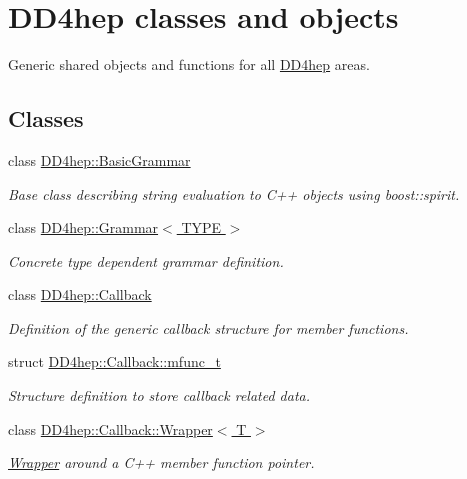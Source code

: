 \hypertarget{group___d_d4_h_e_p}{
\section{DD4hep classes and objects}
\label{group___d_d4_h_e_p}
}


Generic shared objects and functions for all \hyperlink{namespace_d_d4hep}{DD4hep} areas.  
\subsection*{Classes}
\begin{DoxyCompactItemize}
\item 
class \hyperlink{class_d_d4hep_1_1_basic_grammar}{DD4hep::BasicGrammar}
\begin{DoxyCompactList}\small\item\em Base class describing string evaluation to C++ objects using boost::spirit. \item\end{DoxyCompactList}\item 
class \hyperlink{class_d_d4hep_1_1_grammar}{DD4hep::Grammar$<$ TYPE $>$}
\begin{DoxyCompactList}\small\item\em Concrete type dependent grammar definition. \item\end{DoxyCompactList}\item 
class \hyperlink{class_d_d4hep_1_1_callback}{DD4hep::Callback}
\begin{DoxyCompactList}\small\item\em Definition of the generic callback structure for member functions. \item\end{DoxyCompactList}\item 
struct \hyperlink{struct_d_d4hep_1_1_callback_1_1mfunc__t}{DD4hep::Callback::mfunc\_\-t}
\begin{DoxyCompactList}\small\item\em Structure definition to store callback related data. \item\end{DoxyCompactList}\item 
class \hyperlink{class_d_d4hep_1_1_callback_1_1_wrapper}{DD4hep::Callback::Wrapper$<$ T $>$}
\begin{DoxyCompactList}\small\item\em \hyperlink{class_d_d4hep_1_1_callback_1_1_wrapper}{Wrapper} around a C++ member function pointer. \item\end{DoxyCompactList}\item 

\end{DoxyCompactItemize}
